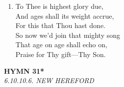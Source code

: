 \documentclass[11pt,a4paper]{article}
\begin{document}
\begin{enumerate}
    \item To Thee is highest glory due, \\
        And ages shall its weight accrue, \\
        For this that Thou hast done. \\
        So now we'd join that mighty song \\
        That age on age shall echo on, \\
        Praise for Thy gift---Thy Son.

\end{enumerate}

\newpage
\begin{center}
    {\Large \textbf{HYMN 31*}}
    \\
    \textit{6.10.10.6. NEW HEREFORD}
\end{center}
\vspace{1em}
\end{document}
